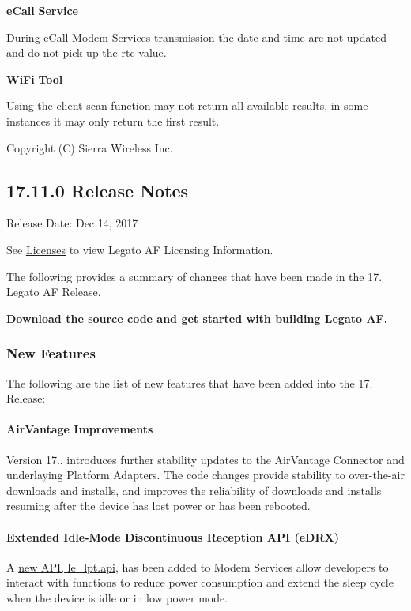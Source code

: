 {\bfseries e\+Call} {\bfseries Service} 
\begin{DoxyItemize}
\item During e\+Call Modem Services transmission the date and time are not updated and do not pick up the rtc value.
\end{DoxyItemize}

{\bfseries Wi\+Fi} {\bfseries Tool} 
\begin{DoxyItemize}
\item Using the client scan function may not return all available results, in some instances it may only return the first result.
\end{DoxyItemize}

Copyright (C) Sierra Wireless Inc. \hypertarget{releaseNotes17110}{}\subsection{17.11.0 Release Notes}\label{releaseNotes17110}
Release Date\+: Dec 14, 2017

See \hyperlink{aboutLicenses}{Licenses} to view Legato AF Licensing Information.

The following provides a summary of changes that have been made in the 17. Legato AF Release.

{\bfseries  Download the \hyperlink{aboutReleaseInfo}{source code} and get started with \hyperlink{basicBuild}{building Legato AF}. }\hypertarget{releaseNotes17110_rn1711_Features}{}\subsubsection{New Features}\label{releaseNotes17110_rn1711_Features}
The following are the list of new features that have been added into the 17. Release\+:\hypertarget{releaseNotes17110_rn1711_Features_AV}{}\paragraph{Air\+Vantage Improvements}\label{releaseNotes17110_rn1711_Features_AV}
Version 17.. introduces further stability updates to the Air\+Vantage Connector and underlaying Platform Adapters. The code changes provide stability to over-\/the-\/air downloads and installs, and improves the reliability of downloads and installs resuming after the device has lost power or has been rebooted.\hypertarget{releaseNotes17110_rn1711_Features_lpt}{}\paragraph{Extended Idle-\/\+Mode Discontinuous Reception A\+P\+I (e\+D\+R\+X)}\label{releaseNotes17110_rn1711_Features_lpt}
A \hyperlink{c_lpt}{new A\+PI, le\+\_\+lpt.api}, has been added to Modem Services allow developers to interact with functions to reduce power consumption and extend the sleep cycle when the device is idle or in low power mode.

